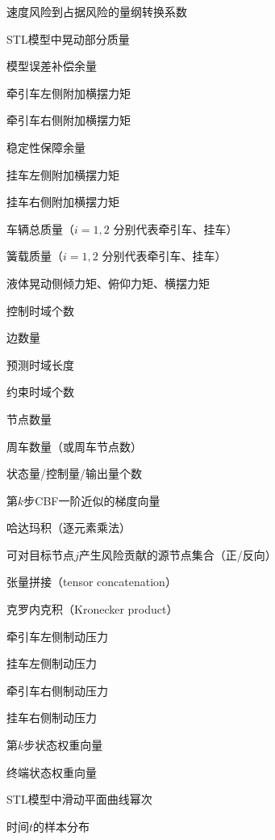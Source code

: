 \begin{denotation}[3cm]
  \item[{$\lambda_{\mathrm{spd}}$}] 速度风险到占据风险的量纲转换系数
  \item[$m$] STL模型中晃动部分质量
  \item[{$\mathcal{M}_1$}] 模型误差补偿余量
  \item[$M_{1z}^+$] 牵引车左侧附加横摆力矩
  \item[$M_{1z}^-$] 牵引车右侧附加横摆力矩
  \item[{$\mathcal{M}_2$}] 稳定性保障余量
  \item[$M_{2z}^+$] 挂车左侧附加横摆力矩
  \item[$M_{2z}^-$] 挂车右侧附加横摆力矩
  \item[$m_i$] 车辆总质量（$i=1,2$ 分别代表牵引车、挂车）
  \item[$m_{si}$] 簧载质量（$i=1,2$ 分别代表牵引车、挂车）
  \item[$M_x,M_y,M_z$] 液体晃动侧倾力矩、俯仰力矩、横摆力矩
  \item[{$N_c$}] 控制时域个数
  \item[{$n_\mathrm{e}$}] 边数量
  \item[{$N_p$}] 预测时域长度
  \item[{$N_r$}] 约束时域个数
  \item[{$n_\mathrm{v}$}] 节点数量
  \item[$n_{veh}$] 周车数量（或周车节点数）
  \item[$n_x,n_u,n_y$] 状态量/控制量/输出量个数
  \item[{$\nabla c_k^x(x_k)$}] 第$k$步CBF一阶近似的梯度向量
  \item[{$\odot$}] 哈达玛积（逐元素乘法）
  \item[{$\Omega_f(j),\Omega_b(j)$}] 可对目标节点$j$产生风险贡献的源节点集合（正/反向）
  \item[$\oplus$] 张量拼接（tensor concatenation）
  \item[{$\otimes$}] 克罗内克积（Kronecker product）
  \item[{$p_{brk}^{L1}$}] 牵引车左侧制动压力
  \item[{$p_{brk}^{L2}$}] 挂车左侧制动压力
  \item[{$p_{brk}^{R1}$}] 牵引车右侧制动压力
  \item[{$p_{brk}^{R2}$}] 挂车右侧制动压力
  \item[{$p_k$}] 第$k$步状态权重向量
  \item[{$p_{N_p}$}] 终端状态权重向量
  \item[{$p_r$}] STL模型中滑动平面曲线幂次
  \item[{$p_t(x)$}] 时间$t$的样本分布

\end{denotation}
